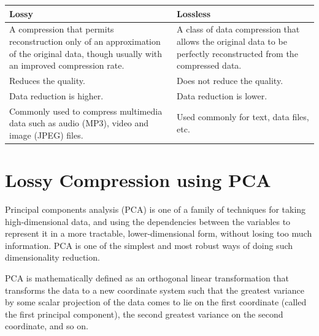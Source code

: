 \begingroup
\centering
    \begin{tabular}{ | p{7cm} | p{7cm} | }
    \hline
    Lossy & Lossless \\ \hline
    A compression
    that permits reconstruction only of an approximation of the original data, though usually with an improved compression rate. & A class of data compression that allows the original data to be perfectly reconstructed from the compressed data. \\ \hline
    Reduces the quality. & Does not reduce the quality. \\ \hline
    Data reduction is higher. & Data reduction is lower. \\ \hline
    Commonly used to compress multimedia data such as audio (MP3), video and image (JPEG) files. & Used commonly for text, data files, etc. \\
    \hline
    \end{tabular}
\label{tbl:lossyvslossless}
\endgroup


\section{Lossy Compression using PCA}

Principal components analysis (PCA) is one of a family of techniques for taking high-dimensional data, and using the dependencies between the variables to represent it in a more tractable, lower-dimensional form, without losing too much information. PCA is one of the simplest and most robust ways of doing such dimensionality reduction.

PCA is mathematically defined as an orthogonal linear transformation that transforms the data to a new coordinate system such that the greatest variance by some scalar projection of the data comes to lie on the first coordinate (called the first principal component), the second greatest variance on the second coordinate, and so on.


